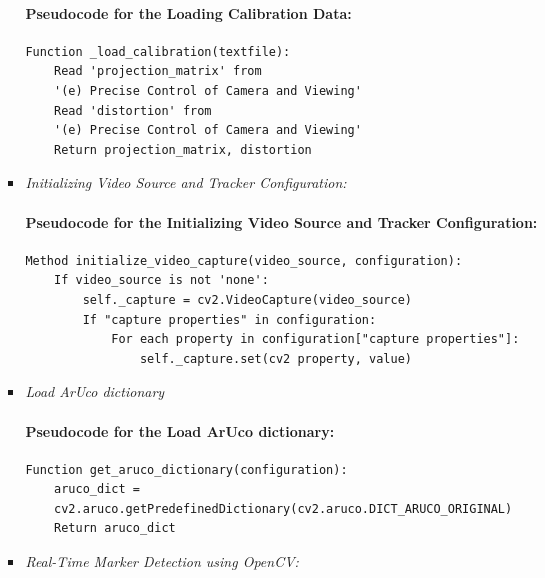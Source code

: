 \documentclass[12pt]{article}
\begin{document}
\begin{enumerate}
\begin{enumerate}
\begin{itemize}
                                    \paragraph{Pseudocode for the Loading Calibration Data:}
                                    \begin{verbatim}
Function _load_calibration(textfile):
    Read 'projection_matrix' from  
    '(e) Precise Control of Camera and Viewing'
    Read 'distortion' from 
    '(e) Precise Control of Camera and Viewing'
    Return projection_matrix, distortion
                              \end{verbatim}
                              \item \textit{Initializing Video Source and Tracker Configuration:}

                                    \paragraph{Pseudocode for the Initializing Video Source and Tracker Configuration:}
                                    \begin{verbatim}
Method initialize_video_capture(video_source, configuration):
    If video_source is not 'none':
        self._capture = cv2.VideoCapture(video_source)
        If "capture properties" in configuration:
            For each property in configuration["capture properties"]:
                self._capture.set(cv2 property, value)
                              \end{verbatim}
                              \item \textit{Load ArUco dictionary}

                                    \paragraph{Pseudocode for the Load ArUco dictionary:}
                                    \begin{verbatim}
Function get_aruco_dictionary(configuration):
    aruco_dict = 
    cv2.aruco.getPredefinedDictionary(cv2.aruco.DICT_ARUCO_ORIGINAL)
    Return aruco_dict
                              \end{verbatim}
                              \item \textit{Real-Time Marker Detection using OpenCV:}


\end{itemize}
\end{enumerate}
\end{enumerate}
\end{document}
